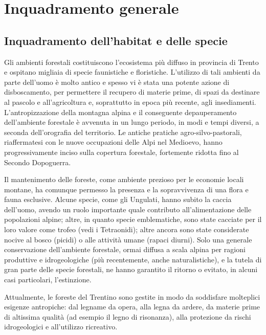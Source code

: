 \documentclass[10pt,twoside,openany,x11names,svgnames,italian,a5paper,dvipsnames,table]{memoir}
\newcommand\chapterillustration{}
\begin{document}
 \normalsize
\setlength\afterchapskip{52mm}
\chapter{Inquadramento generale}
\renewcommand\chapterillustration{1.JPG}

\section{Inquadramento dell'habitat e delle specie}
Gli ambienti forestali costituiscono l’ecosistema più diffuso in provincia di Trento e ospitano migliaia di specie faunistiche e floristiche. L’utilizzo di tali ambienti da parte dell’uomo è molto antico e spesso vi è stata una potente azione di disboscamento, per permettere il recupero di materie prime, di spazi da destinare al pascolo e all’agricoltura e, soprattutto in epoca più recente, agli insediamenti. L’antropizzazione della montagna alpina e il conseguente depauperamento dell’ambiente forestale è avvenuta in un lungo periodo, in modi e tempi diversi, a seconda dell’orografia del territorio. Le antiche pratiche agro-silvo-pastorali, riaffermatesi con le nuove occupazioni delle Alpi nel Medioevo, hanno progressivamente inciso sulla copertura forestale, fortemente ridotta fino al Secondo Dopoguerra. 

Il mantenimento delle foreste, come ambiente prezioso per le economie locali montane, ha comunque permesso la presenza e la sopravvivenza di una flora e fauna esclusive. Alcune specie, come gli Ungulati, hanno subito la caccia dell’uomo, avendo un ruolo importante quale contributo all’alimentazione delle popolazioni alpine; altre, in quanto specie emblematiche, sono state cacciate per il loro valore come trofeo (vedi i Tetraonidi); altre ancora sono state considerate nocive al bosco (picidi) o alle attività umane (rapaci diurni). Solo una generale conservazione dell’ambiente forestale, ormai diffusa a scala alpina per ragioni produttive e idrogeologiche (più recentemente, anche naturalistiche), e la tutela di gran parte delle specie forestali, ne hanno garantito il ritorno o evitato, in alcuni casi particolari, l’estinzione.

Attualmente, le foreste del Trentino sono gestite in modo da soddisfare molteplici esigenze  antropiche: dal legname da opera, alla legna da ardere, da materie prime di altissima qualità (ad esempio il legno di risonanza), alla protezione da rischi idrogeologici e all'utilizzo ricreativo.
\end{document}
